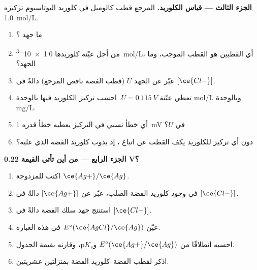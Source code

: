 \begin{problem}
\medskip
\noindent\textbf{الجزء الثالث --- قياس الكلوريد.}
المرجع قطب كالوميل في كلوريد البوتاسيوم تركيزه \qty{1.0}{mol/L}.
\begin{enumerate}[resume]
  \item ما جهد ؟
  \item من أجل عيّنة كلوريدها \qty{1.0e-3}{mol/L}، أي القطبين هو
        القطب الموجب، وما الجهد؟
  \item عبّر عن الجهد $U$ (قطب الفضة ناقص المرجع) دالةً
        في $[\ce{Cl-}]$.
  \item تعطي عيّنة $U = \qty{0.115}{V}$. احسب تركيز الكلوريد فيها
        بالوحدة \unit{mol/L} وبالوحدة \unit{mg/L}.
  \item أي خطأ نسبي في التركيز يعطيه خطأ قدره \qty{1}{mV} في $U$؟
  \item دون أي تركيز للكلوريد يكف القطب عن
        اتباع ، إذ يذوب كلوريد الفضة الذي عليه؟
\end{enumerate}

\medskip
\noindent\textbf{الجزء الرابع --- من أين تأتي القيمة 0.22 V؟}
\begin{enumerate}[resume]
  \item اكتب  للمزدوجة $\ce{Ag+}/\ce{Ag}$.
  \item في وجود كلوريد الفضة الصلب، عبّر عن $[\ce{Ag+}]$ دالةً
        في $[\ce{Cl-}]$.
  \item استنتج جهد سلك الفضة دالةً في
        $[\ce{Cl-}]$.
  \item عيّن $E^\circ(\ce{AgCl}/\ce{Ag})$ في هذه العبارة.
  \item احسبه انطلاقًا من $E^\circ(\ce{Ag+}/\ce{Ag})$ و$\mathrm{p}K_s$،
        وقارنه بقيمة الجدول.
  \item اذكر  لقطب الفضة--كلوريد الفضة
        بمنزلتين عشريتين.
\end{enumerate}
\end{problem}

